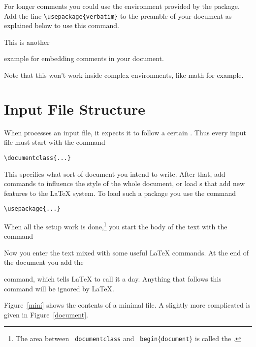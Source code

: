For longer comments you could use the  environment
provided by the  package. Add the
line \verb|\usepackage{verbatim}| to the preamble of your document as
explained below to use this command.

\begin{example}
This is another
\begin{comment}
rather stupid,
but helpful
\end{comment}
example for embedding
comments in your document.
\end{example}

Note that this won't work inside complex environments, like math for example.

\section{Input File Structure}
\label{sec:structure}
When \LaTeXe{} processes an input file, it expects it to follow a
certain . Thus every input file must start with the
command
\begin{code}
\verb|\documentclass{...}|
\end{code}
This specifies what sort of document you intend to write. After that,
add commands to influence the style of the whole
document, or load s that add new
features to the \LaTeX{} system. To load such a package you use the
command
\begin{code}
\verb|\usepackage{...}|
\end{code}

When all the setup work is done,\footnote{The area between \texttt{\bs
    documentclass} and \texttt{\bs
    begin$\mathtt{\{}$document$\mathtt{\}}$} is called the
  \emph{}.} you start the body of the text with the
command

\begin{code}
\verb||
\end{code}

Now you enter the text mixed with some useful \LaTeX{} commands.  At
the end of the document you add the
\begin{code}
\verb||
\end{code}
command, which tells \LaTeX{} to call it a day. Anything that
follows this command will be ignored by \LaTeX.

Figure~\ref{mini} shows the contents of a minimal \LaTeXe{} file. A
slightly more complicated  is given in
Figure~\ref{document}.

